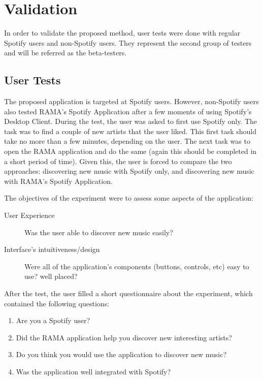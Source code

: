 

  \clearpage

\section{Validation} %
\label{sec:validation}

  In order to validate the proposed method, user tests were done with regular Spotify users and non-Spotify users.
  They represent the second group of testers and will be referred as the beta-testers.

  \subsection{User Tests} %
  \label{sub:user_tests}

    The proposed application is targeted at Spotify users.
    However, non-Spotify users also tested RAMA's Spotify Application after a few moments of using Spotify's Desktop Client.
    During the test, the user was asked to first use Spotify only.
    The task was to find a couple of new artists that the user liked.
    This first task should take no more than a few minutes, depending on the user.
    The next task was to open the RAMA application and do the same (again this should be completed in a short period of time).
    Given this, the user is forced to compare the two approaches: discovering new music with Spotify only, and discovering new music with RAMA's Spotify Application.

    The objectives of the experiment were to assess some aspects of the application:

    \begin{description}
      \item[User Experience]
        Was the user able to discover new music easily?
      \item[Interface's intuitiveness/design]
        Were all of the application's components (buttons, controls, etc) easy to use? well placed?
    \end{description}

    After the test, the user filled a short questionnaire about the experiment, which contained the following questions:

    \begin{enumerate}
      \item Are you a Spotify user?
      \item Did the RAMA application help you discover new interesting artists?
      \item Do you think you would use the application to discover new music?
      \item Was the application well integrated with Spotify?
    \end{enumerate}

